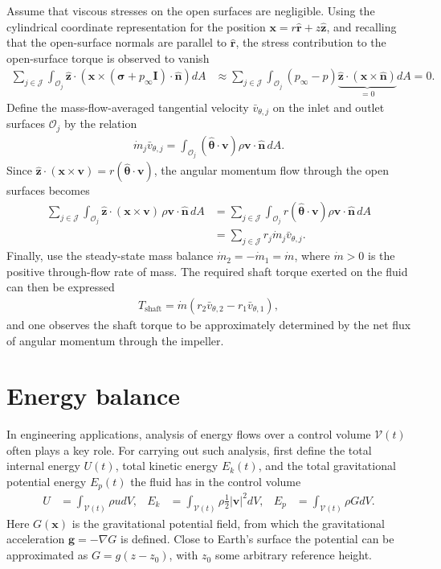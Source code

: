 \begin{example}
    Assume that viscous stresses on the open surfaces are negligible. Using the cylindrical coordinate representation for the position $\bm{x}=r\bm{\hat{r}}+z\bm{\hat{z}}$, and recalling that the open-surface normals are parallel to $\bm{\hat{r}}$, the stress contribution to the open-surface torque is observed to vanish
    \begin{align*}
        \sum_{j\in\mathcal{J}}\int_{\mathcal{O}_j}\bm{\hat{z}}\cdot\left(\bm{x}\times(\bm{\sigma}+p_\infty\bm{I})\cdot\bm{\hat{n}}\right)dA&\approx\sum_{j\in\mathcal{J}}\int_{\mathcal{O}_j}(p_\infty-p)\underbrace{\bm{\hat{z}}\cdot(\bm{x}\times\bm{\hat{n}})}_{=0}dA=0.
    \end{align*}
    Define the mass-flow-averaged tangential velocity $\bar{v}_{\theta,j}$ on the inlet and outlet surfaces $\mathcal{O}_j$ by the relation
    \begin{align*}
        \dot{m}_j\bar{v}_{\theta,j}=\int_{\mathcal{O}_j}(\bm{\hat{\theta}}\cdot\bm{v})\rho\bm{v}\cdot\bm{\hat{n}}\,dA.
    \end{align*}
    Since $\bm{\hat{z}}\cdot(\bm{x}\times\bm{v})=r(\bm{\hat{\theta}}\cdot\bm{v})$, the angular momentum flow through the open surfaces becomes
    \begin{align*}
        \sum_{j\in\mathcal{J}}\int_{\mathcal{O}_j}\bm{\hat{z}}\cdot(\bm{x}\times\bm{v})\,\rho\bm{v}\cdot\bm{\hat{n}}\,dA&=\sum_{j\in\mathcal{J}}\int_{\mathcal{O}_j}r(\bm{\hat{\theta}}\cdot\bm{v})\rho\bm{v}\cdot\bm{\hat{n}}\,dA
        \\
        &=\sum_{j\in\mathcal{J}}r_j\dot{m}_j\bar{v}_{\theta,j}.
    \end{align*}
    Finally, use the steady-state mass balance $\dot{m}_2=-\dot{m}_1=\dot{m}$, where $\dot{m}>0$ is the positive through-flow rate of mass. The required shaft torque exerted on the fluid can then be expressed
    \begin{align*}
        T_\text{shaft}=\dot{m}\left(r_2\bar{v}_{\theta,2}-r_1\bar{v}_{\theta,1}\right),
    \end{align*}
    and one observes the shaft torque to be approximately determined by the net flux of angular momentum through the impeller.
\end{example}


\section{Energy balance}
In engineering applications, analysis of energy flows over a control volume $\mathcal{V}(t)$ often plays a key role. For carrying out such analysis, first define the total internal energy $U(t)$, total kinetic energy $E_k(t)$, and the total gravitational potential energy $E_p(t)$ the fluid has in the control volume 
\begin{align}
    U&=\int_{\mathcal{V}(t)}\rho udV, & E_k&=\int_{\mathcal{V}(t)}\rho\frac{1}{2}|\bm{v}|^2dV, & E_p&=\int_{\mathcal{V}(t)}\rho GdV.
\end{align}
Here $G(\bm{x})$ is the gravitational potential field, from which the gravitational acceleration $\bm{g}=-\nabla G$ is defined. Close to Earth's surface the potential can be approximated as $G=g(z-z_0)$, with $z_0$ some arbitrary reference height.

